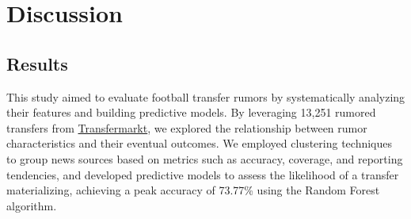 \section{Discussion}
\label{sec:5_conclu}
% 
% 
% 
% 
% 
\subsection{Results}
This study aimed to evaluate football transfer rumors by systematically analyzing their features and building predictive models. By leveraging 13,251 rumored transfers from \href{https://www.transfermarkt.co.uk}{Transfermarkt}, we explored the relationship between rumor characteristics and their eventual outcomes. We employed clustering techniques to group news sources based on metrics such as accuracy, coverage, and reporting tendencies, and developed predictive models to assess the likelihood of a transfer materializing, achieving a peak accuracy of 73.77\% using the Random Forest algorithm.


